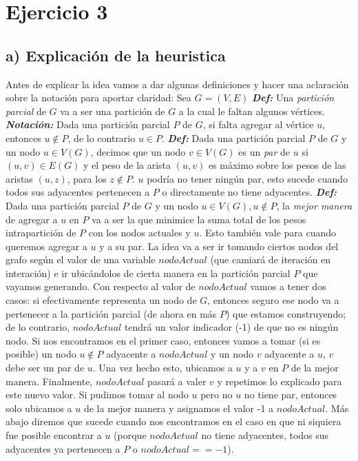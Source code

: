\documentclass[a4paper]{article}
\begin{document}
\section*{Ejercicio 3}
\subsection*{a) Explicación de la heuristica}
Antes de explicar la idea vamos a dar algunas definiciones y hacer una aclaración sobre la notación para aportar claridad:
\newline Sea $G = (V, E)$
\newline \textit{\textbf{Def:}} Una \textit{partición parcial} de $G$ va a ser una partición de $G$ a la cual le faltan algunos vértices.
\newline \textit{\textbf{Notación: }} Dada una partición parcial $P$ de $G$, si falta agregar al vértice $u$, entonces $u \notin P$, de lo contrario $u \in P$.
\newline \textit{\textbf{Def:}} Dada una partición parcial $P$ de $G$ y un nodo $u \in V(G)$, decimos que un nodo $v \in V(G)$ es un \textit{par} de $u$ si $(u, v) \in E(G)$ y el peso de la arista $(u, v)$ es máximo sobre los pesos de las aristas $(u, z)$, para los $z \notin P$. $u$ podría no tener ningún par, esto sucede cuando todos sus adyacentes pertenecen a $P$ o directamente no tiene adyacentes.
\newline \textit{\textbf{Def:}} Dada una partición parcial $P$ de $G$ y un nodo $u \in V(G), u \notin P$, la \textit{mejor manera} de agregar a $u$ en $P$ va a ser la que minimice la suma total de los pesos intrapartición de $P$ con los nodos actuales y $u$. Esto también vale para cuando queremos agregar a $u$ y a su par.
\newline
\newline
La idea va a ser ir tomando ciertos nodos del grafo según el valor de una variable $nodoActual$ (que camiará de iteración en interación) e ir ubicándolos de cierta manera en la partición parcial $P$ que vayamos generando. Con respecto al valor de $nodoActual$ vamos a tener dos casos: si efectivamente representa un nodo de $G$, entonces seguro ese nodo va a pertenecer a la partición parcial (de ahora en más $P$) que estamos construyendo; de lo contrario,  $nodoActual$ tendrá un valor indicador (-1) de que no es ningún nodo. 
\newline Si nos encontramos en el primer caso, entonces vamos a tomar (si es posible) un nodo $u \notin P$ adyacente a $nodoActual$ y un nodo $v$ adyacente a $u$, $v$ debe ser un par de $u$. Una vez hecho esto, ubicamos a $u$ y a $v$ en $P$ de la mejor manera. Finalmente, $nodoActual$ pasará a valer $v$ y repetimos lo explicado para este nuevo valor. Si pudimos tomar al nodo $u$ pero no $u$ no tiene par, entonces solo ubicamos a $u$ de la mejor manera y asignamos el valor -1 a $nodoActual$. Más abajo diremos que sucede cuando nos encontramos en el caso en que ni siquiera fue posible encontrar a $u$ (porque $nodoActual$ no tiene adyacentes, todos sus adyacentes ya pertenecen a $P$ o $nodoActual == -1$).
\end{document}
